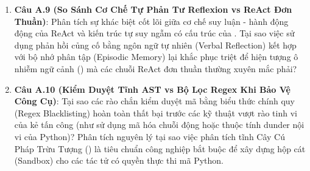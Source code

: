 \begin{enumerate}
  \item \textbf{Câu A.9 (So Sánh Cơ Chế Tự Phản Tư Reflexion vs ReAct Đơn Thuần)}: Phân tích sự khác biệt cốt lõi giữa cơ chế suy luận - hành động động của ReAct và kiến trúc tự suy ngẫm có cấu trúc của . Tại sao việc sử dụng phản hồi củng cố bằng ngôn ngữ tự nhiên (Verbal Reflection) kết hợp với bộ nhớ phân tập (Episodic Memory) lại khắc phục triệt để hiện tượng ô nhiễm ngữ cảnh () mà các chuỗi ReAct đơn thuần thường xuyên mắc phải?
  \item \textbf{Câu A.10 (Kiểm Duyệt Tĩnh AST vs Bộ Lọc Regex Khi Bảo Vệ Công Cụ)}: Tại sao các rào chắn kiểm duyệt mã bằng biểu thức chính quy (Regex Blacklisting) hoàn toàn thất bại trước các kỹ thuật vượt rào tinh vi của kẻ tấn công (như sử dụng mã hóa chuỗi động hoặc thuộc tính dunder nội vi của Python)? Phân tích nguyên lý tại sao việc phân tích tĩnh Cây Cú Pháp Trừu Tượng () là tiêu chuẩn công nghiệp bắt buộc để xây dựng hộp cát (Sandbox) cho các tác tử có quyền thực thi mã Python.
\end{enumerate}

